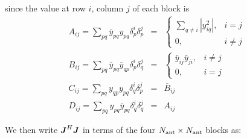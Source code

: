 \documentclass[useAMS,usenatbib]{mn2e}
\makeatletter
\newcommand{\mat}[1]{{\bmath{#1}}}
\newcommand{\JJ}{\mat{J}} %
\newcommand{\Matrix}[2]{\left [ \begin{array}{@{}#1@{}}#2\end{array} \right ]}
\makeatother
\begin{document}
since the value at row $i$, column $j$ of each block is
\begin{eqnarray}
A_{ij} = \sum_{pq} \bar{y}_{pq} y_{pq} \delta^{i}_p \delta^{j}_p &=& 
  \left \{ \begin{array}{cc}
        \sum\limits_{q\ne i} |y_{iq}^2|, & \scriptstyle i=j \\
        0,  & \scriptstyle  i\ne j
  \end{array} \right .\nonumber\\ 
B_{ij} = \sum_{pq} \bar{y}_{pq} \bar{y}_{qp} \delta^{i}_p \delta^{j}_q &=& 
  \left \{ \begin{array}{cc}
      \bar{y}_{ij} \bar{y}_{ji}, & \scriptstyle i\ne j\\
      0, & \scriptstyle i=j
  \end{array} \right .\nonumber\\ 
C_{ij} = \sum_{pq} y_{qp} y_{pq} \delta^{i}_q \delta^{j}_p &=& 
  \bar{B}_{ij} \nonumber\\
D_{ij} = \sum_{pq} y_{pq} \bar{y}_{pq} \delta^{i}_q \delta^{j}_q &=& A_{ij} 
\label{eq:JHJ:DI:ABCD1}
\end{eqnarray}

We then write $\JJ^H\JJ$ in terms of the four $N_\mathrm{ant}\times N_\mathrm{ant}$ blocks as:

\newcommand{\JHJblocksFull}[4]{
\Matrix{c@{}c@{}c}{
 #1 & \bigg |~ & #2 \\[10pt]
 \hline \\[-8pt]
 #3 & \bigg |~ & #4 }
}

\newcommand{\JHJblocks}[2]{
\Matrix{c@{}c@{}c}{
 #1 & \big |~ & \nearrow^H \\
 \hline \\[-8pt]
 #2 & \bigg |~ & \searrow~~ }
}
\end{document}
